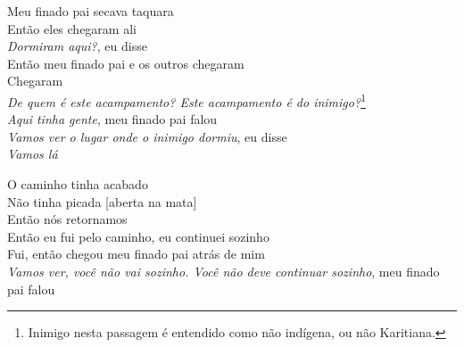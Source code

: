 \begin{linenumbers}
 
\noindent   Meu finado pai secava taquara\\
  Então eles chegaram ali\\
  \textit{Dormiram aqui?}, eu disse\\
  Então meu finado pai e os outros chegaram\\
  Chegaram\\
  \textit{De quem é este acampamento? Este acampamento é do inimigo?}\footnote{Inimigo nesta passagem é entendido como não indígena, ou não Karitiana.}\\
  \textit{Aqui tinha gente}, meu finado pai falou\\
  \textit{Vamos ver o lugar onde o inimigo dormiu}, eu disse\\
  \textit{Vamos lá}
 
\end{linenumbers}

\bigskip

\begin{linenumbers}
 
\noindent   O caminho tinha acabado\\
  Não tinha picada {[}aberta na mata{]}\\
  Então nós retornamos\\
  Então eu fui pelo caminho, eu continuei sozinho\\
  Fui, então chegou meu finado pai atrás de mim\\
  \textit{Vamos ver, você não vai sozinho. Você não deve continuar sozinho},
 meu finado pai falou
 
\end{linenumbers}

